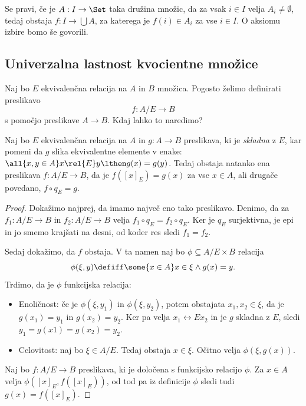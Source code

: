 Se pravi, če je $A : I \to \Set$ taka družina množic, da za vsak $i \in I$ velja $A_i \neq \emptyset$,
tedaj obstaja $f : I \to \bigcup A$, za katerega je $f(i) \in A_i$ za vse $i \in I$.
%
O aksiomu izbire bomo še govorili.


\subsection{Univerzalna lastnost kvocientne množice}

Naj bo $E$ ekvivalenčna relacija na $A$ in $B$ množica. Pogosto želimo definirati
preslikavo
%
\begin{equation*}
    f : A/E \to B
\end{equation*}
%
s pomočjo preslikave $A \to B$. Kdaj lahko to naredimo?

\begin{izrek}
  Naj bo $E$ ekvivalenčna relacija na $A$ in $g : A \to B$ preslikava, ki je \emph{skladna} z $E$, kar pomeni da $g$
  slika ekvivalentne elemente v enake: $\all{x, y \in A} x \rel{E} y \lthen g(x) = g(y)$. Tedaj obstaja natanko ena
  preslikava $f : A/E \to B$, da je $f([x]_E) = g(x)$ za vse $x \in A$, ali drugače povedano, $f \circ q_E = g$.
\end{izrek}

\begin{proof}
  Dokažimo najprej, da imamo največ eno tako preslikavo. Denimo, da za $f_1 : A/E \to B$ in
  $f_2 : A/E \to B$ velja $f_1 \circ q_E = f_2 \circ q_E$. Ker je $q_E$ surjektivna, je epi in jo smemo
  krajšati na desni, od koder res sledi $f_1 = f_2$.

  Sedaj dokažimo, da $f$ obstaja. V ta namen naj bo $\phi \subseteq A/E \times B$ relacija
  \begin{equation*}
    \phi(\xi, y) \defiff \some{x \in A} x \in \xi \land g(x) = y.
  \end{equation*}
  Trdimo, da je $\phi$ funkcijska relacija:
  \begin{itemize}
  \item
    Enoličnost: če je $\phi(\xi, y_1)$ in $\phi(\xi, y_2)$, potem obstajata $x_1, x_2 \in \xi$, da je $g(x_1) = y_1$
    in $g(x_2) = y_2$. Ker pa velja $x_1 \rel{E} x_2$ in je $g$ skladna z $E$, sledi $y_1 = g(x1) = g(x_2) = y_2$.

  \item  Celovitost: naj bo $\xi \in A/E$. Tedaj obstaja $x \in \xi$. Očitno velja $\phi(\xi, g(x))$.
  \end{itemize}
  Naj bo $f : A/E \to B$ preslikava, ki je določena s funkcijsko relacijo $\phi$. Za $x \in A$
  velja $\phi([x]_E, f([x]_E))$, od tod pa iz definicije $\phi$ sledi tudi $g(x) = f([x]_E)$.
\end{proof}

